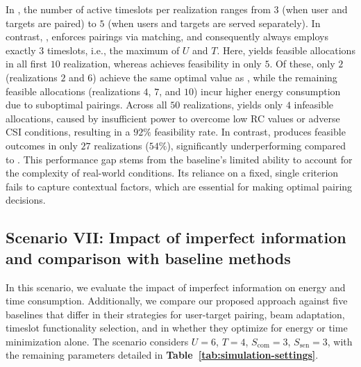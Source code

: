 \documentclass[10pt,journal,compsoc]{IEEEtran}
\newcommand\mytextsf{\bfseries\sffamily\fontsize{9pt}{9pt}\selectfont}
\theoremstyle{myremark}
\theoremstyle{myexample}
\begin{document}
In {\mytextsf{OPT}}, the number of active timeslots per realization ranges from  $ 3 $ (when user and targets are paired) to $ 5 $ (when users and targets are served separately). In contrast, {\mytextsf{BL1}}, enforces pairings via matching, and consequently always employs exactly $ 3 $ timeslots, i.e., the maximum of $ U $ and $ T $. Here, {\mytextsf{OPT}} yields feasible allocations in all first $ 10 $ realization, whereas {\mytextsf{BL1}} achieves feasibility in only $ 5 $. Of these, only $ 2 $ (realizations $ 2 $ and $ 6 $) achieve the same optimal value as {\mytextsf{OPT}}, while the remaining feasible allocations (realizations $ 4 $, $ 7 $, and $ 10$) incur higher energy consumption due to suboptimal pairings. Across all $ 50 $ realizations, {\mytextsf{OPT}} yields only $ 4 $ infeasible allocations, caused by insufficient power to overcome low \gls{RC} values or adverse \gls{CSI} conditions, resulting in a $ 92\% $ feasibility rate. In contrast, {\mytextsf{BL1}} produces feasible outcomes in only $ 27 $ realizations ($ 54\% $), significantly underperforming compared to {\mytextsf{OPT}}. This performance gap stems from the baseline's limited ability to account for the complexity of real-world conditions. Its reliance on a fixed, single criterion fails to capture contextual factors, which are essential for making optimal pairing decisions.
 
 
 


 








\subsection{Scenario VII: Impact of imperfect information and comparison with baseline methods}





In this scenario, we evaluate the impact of imperfect information on energy and time consumption. Additionally, we compare our proposed approach against five baselines that differ in their strategies for user-target pairing, beam adaptation, timeslot functionality selection, and in whether they optimize for energy or time minimization alone. The scenario considers $ U = 6 $, $ T = 4 $, $ S_\mathrm{com} = 3 $, $ S_\mathrm{sen} = 3 $, with the remaining parameters detailed in \textbf{Table~\ref{tab:simulation-settings}}.
\end{document}
